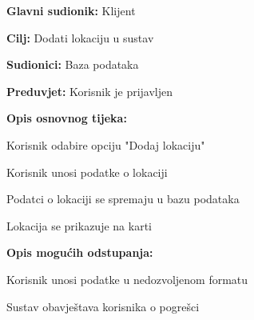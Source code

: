 					\noindent {}
					\begin{packed_item}
	
						\item \textbf{Glavni sudionik: }Klijent
						\item  \textbf{Cilj:} Dodati lokaciju u sustav
						\item  \textbf{Sudionici:} Baza podataka
						\item  \textbf{Preduvjet:} Korisnik je prijavljen
						\item  \textbf{Opis osnovnog tijeka:}
						
						\item[] \begin{packed_enum}
	
							\item Korisnik odabire opciju "Dodaj lokaciju"
							\item Korisnik unosi podatke o lokaciji
							\item Podatci o lokaciji se spremaju u bazu podataka
							\item Lokacija se prikazuje na karti

						\end{packed_enum}
						
						\item  \textbf{Opis mogućih odstupanja:}
						
						\item[] \begin{packed_item}
	
							\item[2.a] Korisnik unosi podatke u nedozvoljenom formatu 
							\item[] \begin{packed_enum}
								
								\item Sustav obavještava korisnika o pogrešci 
								
							\end{packed_enum}
							
						\end{packed_item}
						
					\end{packed_item}
					
